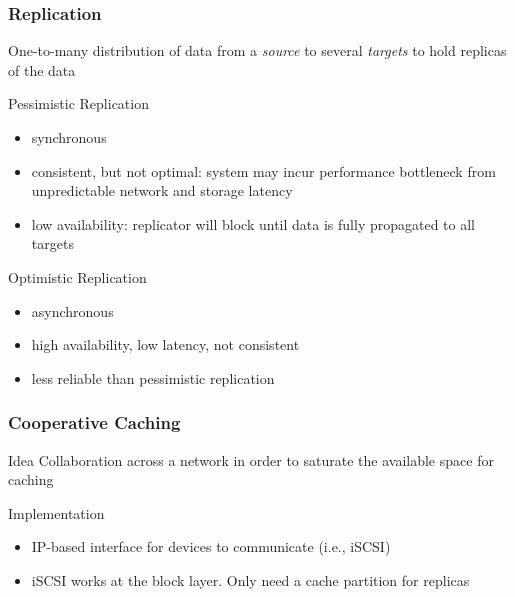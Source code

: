 \begin{frame}
    \frametitle{Replication}
    One-to-many distribution of data from a \textit{source}
    to several \textit{targets} to hold replicas of the data
    \begin{block}{Pessimistic Replication}
	\begin{itemize}
	    \item synchronous
	    \item consistent, but not optimal: system may incur
		performance bottleneck from unpredictable network
		and storage latency
	    \item low availability: replicator will block until data is
		fully propagated to all targets
	\end{itemize}
    \end{block}
    \begin{block}{Optimistic Replication}
	\begin{itemize}
	    \item asynchronous
	    \item high availability, low latency, not consistent
	    \item less reliable than pessimistic replication
	\end{itemize}
    \end{block}
\end{frame}
\begin{frame}
    \frametitle{Cooperative Caching}
    \begin{block}{Idea}
	Collaboration across a network in order to saturate
	the available space for caching
    \end{block}
    \begin{block}{Implementation}
	\begin{itemize}
	    \item IP-based interface for devices to communicate (i.e., iSCSI)
	    \item iSCSI works at the block layer. Only need a cache
		partition for replicas
	\end{itemize}
    \end{block}
\end{frame}
